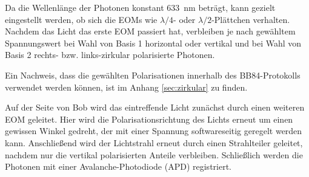Da die Wellenlänge der Photonen konstant \SI{633}{nm} beträgt, kann gezielt
eingestellt werden, ob sich die EOMs wie $λ/4$- oder $λ/2$-Plättchen verhalten.
Nachdem das Licht das erste EOM passiert hat, verbleiben je nach gewähltem
Spannungswert bei Wahl von Basis 1 horizontal oder vertikal und bei Wahl von
Basis 2 rechts- bzw. links-zirkular polarisierte Photonen.

Ein Nachweis, dass die gewählten Polarisationen innerhalb des BB84-Protokolls
verwendet werden können, ist im Anhang \ref{sec:zirkular} zu finden.

Auf der Seite von Bob wird das eintreffende Licht zunächst durch einen weiteren
EOM geleitet. Hier wird die Polarisationsrichtung des Lichts erneut um einen
gewissen Winkel gedreht, der mit einer Spannung softwareseitig geregelt werden
kann. Anschließend wird der Lichtstrahl erneut durch einen Strahlteiler
geleitet, nachdem nur die vertikal polarisierten Anteile verbleiben.
Schließlich werden die Photonen mit einer Avalanche-Photodiode (APD)
registriert.
